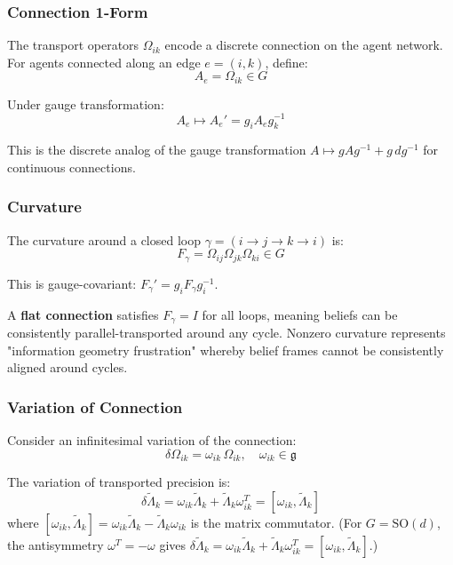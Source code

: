 \documentclass[12pt]{article}
\begin{document}
\subsubsection{Connection 1-Form}

The transport operators $\Omega_{ik}$ encode a discrete connection on the agent network. For agents connected along an edge $e = (i,k)$, define:
\begin{equation}
A_e = \Omega_{ik} \in G
\end{equation}

Under gauge transformation:
\begin{equation}
A_e \mapsto A_e' = g_i A_e g_k^{-1}
\end{equation}

This is the discrete analog of the gauge transformation $A \mapsto gAg^{-1} + g\,dg^{-1}$ for continuous connections.

\subsubsection{Curvature}

The curvature around a closed loop $\gamma = (i \to j \to k \to i)$ is:
\begin{equation}
F_\gamma = \Omega_{ij}\Omega_{jk}\Omega_{ki} \in G
\end{equation}

This is gauge-covariant: $F_\gamma' = g_i F_\gamma g_i^{-1}$.

A \textbf{flat connection} satisfies $F_\gamma = I$ for all loops, meaning beliefs can be consistently parallel-transported around any cycle. Nonzero curvature represents "information geometry frustration" whereby belief frames cannot be consistently aligned around cycles.

\subsubsection{Variation of Connection}

Consider an infinitesimal variation of the connection:
\begin{equation}
\delta\Omega_{ik} = \omega_{ik} \, \Omega_{ik}, \quad \omega_{ik} \in \mathfrak{g}
\end{equation}

The variation of transported precision is:
\begin{equation}
\delta\tilde{\Lambda}_k = \omega_{ik}\tilde{\Lambda}_k + \tilde{\Lambda}_k\omega_{ik}^T = [\omega_{ik}, \tilde{\Lambda}_k]
\end{equation}
where $[\omega_{ik}, \tilde{\Lambda}_k] = \omega_{ik}\tilde{\Lambda}_k - \tilde{\Lambda}_k\omega_{ik}$ is the matrix commutator. (For $G = \mathrm{SO}(d)$, the antisymmetry $\omega^T = -\omega$ gives $\delta\tilde{\Lambda}_k = \omega_{ik}\tilde{\Lambda}_k + \tilde{\Lambda}_k\omega_{ik}^T = [\omega_{ik}, \tilde{\Lambda}_k]$.)
\end{document}
